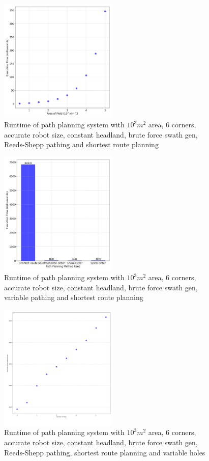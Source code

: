 \documentclass[final]{cmpreport_02}
\begin{document}
\begin{figure}[h!]
	\centering
	\includegraphics[width=0.5\textwidth]{./images/pathingSizeRt.png}
	\caption{Runtime of path planning system with $10^3m^2$ area, 6 corners, accurate robot size, constant headland, brute force swath gen, Reeds-Shepp pathing and shortest route planning}
	\label{PE:p:SizeRT}
\end{figure}


\begin{figure}[h!]
	\centering
	\includegraphics[width=0.5\textwidth]{./images/pathingRoutePlanningRT.png}
	\caption{Runtime of path planning system with $10^3m^2$ area, 6 corners, accurate robot size, constant headland, brute force swath gen, variable pathing and shortest route planning}
	\label{PE:p:RoutePlanningRT}
\end{figure}


\begin{figure}[h!]
	\centering
	\includegraphics[width=0.5\textwidth]{./images/pathingHolesRT.png}
	\caption{Runtime of path planning system with $10^3m^2$ area, 6 corners, accurate robot size, constant headland, brute force swath gen, Reeds-Shepp pathing, shortest route planning and variable holes}
	\label{PE:p:HolesRT}
\end{figure}
\end{document}
